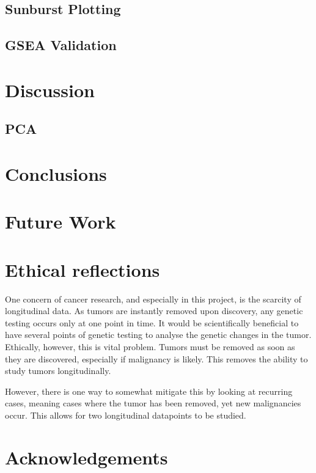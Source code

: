 \documentclass{kththesis}
\begin{document}
     \section{Sunburst Plotting}


     \section{GSEA Validation}




\chapter{Discussion}

     \section{PCA}



\chapter{Conclusions}



\chapter{Future Work}




\chapter{Ethical reflections}
One concern of cancer research, and especially in this project, is the scarcity of longitudinal data. As tumors are instantly removed upon discovery, any genetic testing occurs only at one point in time. It would be scientifically beneficial to have several points of genetic testing to analyse the genetic changes in the tumor. Ethically, however, this is vital problem. Tumors must be removed as soon as they are discovered, especially if malignancy is likely. This removes the ability to study tumors longitudinally.

However, there is one way to somewhat mitigate this by looking at recurring cases, meaning cases where the tumor has been removed, yet new malignancies occur. This allows for two longitudinal datapoints to be studied.

\begin{comment}
är detta kanske lite utanför thesis eftersom jag inte använder mer än en datapunkt?
\end{comment}





\chapter{Acknowledgements}

\printbibliography[title=References]

\appendix


\tailmatter
\end{document}
